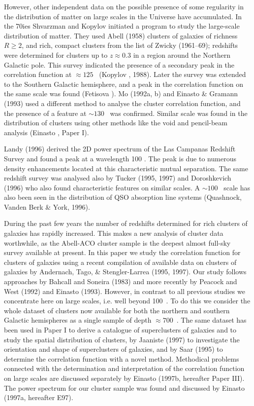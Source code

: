 However, other independent data on the possible presence of some
regularity in the distribution of matter on large scales in the
Universe have accumulated.  In the 70ies Shvarzman and Kopylov
initiated a program to study the large-scale distribution of matter.
They used Abell (1958) clusters of galaxies of richness $R\geq 2$, and
rich, compact clusters from the list of Zwicky \etal (1961--69);
redshifts were determined for clusters up to $z\approx 0.3$ in a
region around the Northern Galactic pole.  This survey indicated the
presence of a secondary peak in the correlation function at $\approx
125$ \Mpc\ (Kopylov , 1988). Later the survey was extended
to the Southern Galactic hemisphere, and a peak in the correlation
function on the same scale was found (Fetisova ).  Mo \etal
(1992a, b) and Einasto \& Gramann (1993) used a different method to
analyse the cluster correlation function, and the presence of a
feature at $\sim 130$ \Mpc\ was confirmed.  Similar scale was found in
the distribution of clusters using other methods like the void and
pencil-beam analysis (Einasto , Paper I).

Landy \etal (1996) derived the 2D power spectrum of the Las Campanas
Redshift Survey and found a peak at a wavelength 100 \Mpc. The peak is
due to numerous density enhancements located at this characteristic
mutual separation.  The same redshift survey was analysed also by
Tucker \etal (1995, 1997) and Doroshkevich \etal (1996) who also found
characteristic features on similar scales.  A $\sim
100$ \Mpc\ scale has also been seen in the distribution of QSO absorption
line systems (Quashnock, Vanden Berk \& York, 1996).

During the past few years the number of redshifts determined for rich
clusters of galaxies has rapidly increased. This makes a new analysis
of cluster data worthwhile, as the Abell-ACO cluster sample is the
deepest almost full-sky survey available at present. In this paper we
study the correlation function for clusters of galaxies using a recent
compilation of available data on clusters of galaxies by Andernach,
Tago, \& Stengler-Larrea (1995, 1997).  Our study follows approaches by
Bahcall and Soneira (1983) and more recently by Peacock and West
(1992) and Einasto \etal (1993). However, in contrast to all previous
studies we concentrate here on large scales, i.e. well beyond 100~\Mpc. To do
this we consider the whole dataset of clusters now available for both
the northern and southern Galactic hemispheres as a single sample of
depth $\approx 700$~\Mpc.  The same dataset has been used in Paper I
to derive a  catalogue of superclusters of galaxies and to study
the spatial distribution of clusters, by Jaaniste \etal (1997) to
investigate the orientation and shape of superclusters of galaxies,
and by Saar \etal (1995) to determine the correlation function with a
novel method.  Methodical problems connected with the determination
and interpretation of the correlation function on large scales are
discussed separately by Einasto \etal (1997b, hereafter Paper
III). The power spectrum for our cluster sample was found and
discussed by Einasto \etal (1997a, hereafter E97).

